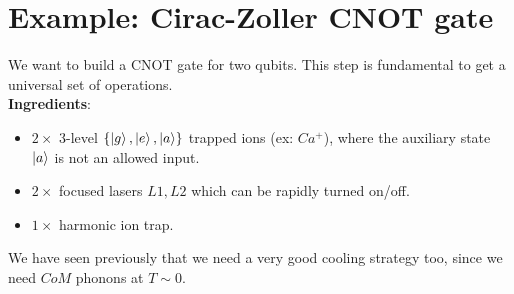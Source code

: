 \section{Example: Cirac-Zoller CNOT gate}

We want to build a CNOT gate for two qubits. This step is fundamental to get a universal set of operations.\\

\noindent \textbf{Ingredients}:
\begin{itemize}
    \item $2 \times$ 3-level $\{\ket{g}, \ket{e}, \ket{a}\}$ trapped ions (ex: $Ca^+$), where the auxiliary state $\ket{a}$ is not an allowed input.
    \item $2 \times$ focused lasers $L1, L2$ which can be rapidly turned on/off.
    \item $1 \times$ harmonic ion trap.
\end{itemize}
\begin{center}
    
\end{center}

We have seen previously that we need a very good cooling strategy too, since we need $CoM$ phonons at $T\sim0$.

